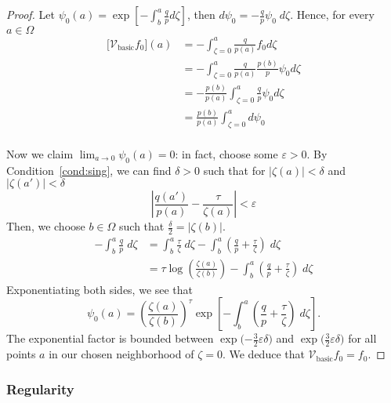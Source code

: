 \documentclass{article}
\theoremstyle{plain}
\newcommand{\hardpart}{\mathcal{V}_\text{basic}}
\begin{document}
\begin{proof}
    Let $\psi_0(a)= \exp\left[-\int_{b}^{a}\frac{q}{p} d\zeta\right]$, then $ d \psi_0 = -\frac{q}{p} \psi_0\;d\zeta $. Hence, for every $a\in\Omega$ 
    \begin{align*}
        \big[\hardpart f_0\big](a) &= - \int_{\zeta=0}^{a} \frac{q}{p(a)} f_0 d\zeta \\
        &= - \int_{\zeta=0}^{a} \frac{q}{p(a)} \frac{p(b)}{p}\psi_0 d\zeta \\
        &= - \frac{p(b)}{p(a)}  \int_{\zeta=0}^{a} \frac{q}{p} \psi_0 d\zeta\\
        &= \frac{p(b)}{p(a)}  \int_{\zeta=0}^{a} d\psi_0  \\
    \end{align*}

    Now we claim $\lim_{a\to 0}\psi_0(a)=0$: in fact, choose some $\varepsilon>0$. By Condition~\eqref{cond:sing}, we can find $\delta>0$ such that for $|\zeta(a)|<\delta$ and $|\zeta(a')|<\delta$
\begin{equation}\label{eqn:limit_h1}
\left|\frac{q(a')}{p(a)} - \frac{\tau}{\zeta(a)}\right|<\varepsilon
\end{equation}
 Then, we choose $b\in\Omega$ such that $\tfrac{\delta}{2}=|\zeta(b)|$.
\begin{align*}
-\int_b^a \frac{q}{p}\;d\zeta & = \int_b^a \frac{\tau}{\zeta}\;d\zeta - \int_b^a \left( \frac{q}{p} + \frac{\tau}{\zeta} \right)\;d\zeta \\
& = \tau \log\left(\frac{\zeta(a)}{\zeta(b)}\right) - \int_b^a \left( \frac{q}{p} + \frac{\tau}{\zeta} \right)\;d\zeta
\end{align*}
Exponentiating both sides, we see that
\[ \psi_0(a) = \left(\frac{\zeta(a)}{\zeta(b)}\right)^\tau \exp\left[-\int_b^a \left( \frac{q}{p} + \frac{\tau}{\zeta} \right)\;d\zeta\right]. \]
The exponential factor is bounded between $\exp\big({-\tfrac{3}{2}\varepsilon\delta}\big)$ and $\exp\big(\tfrac{3}{2}\varepsilon\delta\big)$ for all points $a$ in our chosen neighborhood of $\zeta = 0$. We deduce that $\hardpart  f_0=f_0$. 
\end{proof}


\subsubsection{Regularity}\label{sec:asymptotics}
\end{document}
